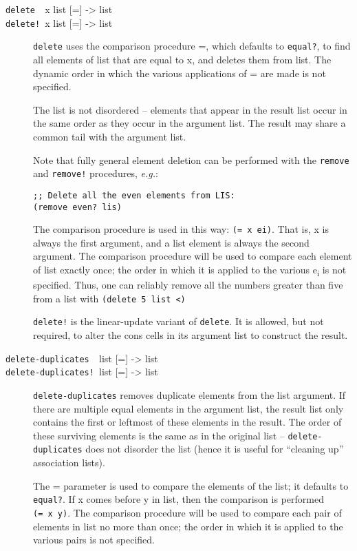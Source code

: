 \begin{description}
\item[ \href{}{} \texttt{delete~~}x list {[}={]} -\textgreater{} list\\
\href{}{} \texttt{delete!~}x list {[}={]} -\textgreater{} list ]
\texttt{delete} uses the comparison procedure =, which defaults to
\texttt{equal?}, to find all elements of list that are equal to x, and
deletes them from list. The dynamic order in which the various
applications of = are made is not specified.

The list is not disordered -- elements that appear in the result list
occur in the same order as they occur in the argument list. The result
may share a common tail with the argument list.

Note that fully general element deletion can be performed with the
\texttt{remove} and \texttt{remove!} procedures, \emph{e.g.}:

\begin{verbatim}
;; Delete all the even elements from LIS:
(remove even? lis)
\end{verbatim}

The comparison procedure is used in this way: \texttt{(=\ x\ ei)}. That
is, x is always the first argument, and a list element is always the
second argument. The comparison procedure will be used to compare each
element of list exactly once; the order in which it is applied to the
various e\textsubscript{i} is not specified. Thus, one can reliably
remove all the numbers greater than five from a list with
\texttt{(delete\ 5\ list\ \textless{})}

\texttt{delete!} is the linear-update variant of \texttt{delete}. It is
allowed, but not required, to alter the cons cells in its argument list
to construct the result.
\item[ \href{}{} \texttt{delete-duplicates~~}list {[}={]}
-\textgreater{} list\\
\href{}{} \texttt{delete-duplicates!~}list {[}={]} -\textgreater{} list
]
\texttt{delete-duplicates} removes duplicate elements from the list
argument. If there are multiple equal elements in the argument list, the
result list only contains the first or leftmost of these elements in the
result. The order of these surviving elements is the same as in the
original list -- \texttt{delete-duplicates} does not disorder the list
(hence it is useful for ``cleaning up'' association lists).

The = parameter is used to compare the elements of the list; it defaults
to \texttt{equal?}. If x comes before y in list, then the comparison is
performed \texttt{(=\ x\ y)}. The comparison procedure will be used to
compare each pair of elements in list no more than once; the order in
which it is applied to the various pairs is not specified.


\end{description}
